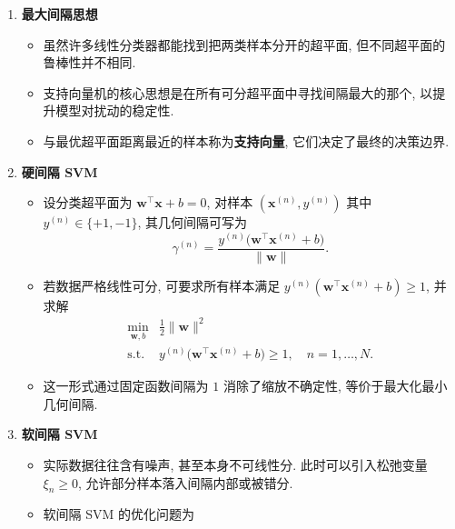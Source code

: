 \documentclass{../nndlcourse}
\begin{document}
\begin{enumerate}
    \item \textbf{最大间隔思想}
    \begin{itemize}
        \item 虽然许多线性分类器都能找到把两类样本分开的超平面, 但不同超平面的鲁棒性并不相同.
        \item 支持向量机的核心思想是在所有可分超平面中寻找间隔最大的那个, 以提升模型对扰动的稳定性.
        \item 与最优超平面距离最近的样本称为\textbf{支持向量}, 它们决定了最终的决策边界.
    \end{itemize}
    \item \textbf{硬间隔 SVM}
    \begin{itemize}
        \item 设分类超平面为 $\boldsymbol{w}^\top \boldsymbol{x} + b = 0$, 对样本 $(\boldsymbol{x}^{(n)}, y^{(n)})$ 其中 $y^{(n)} \in \{+1, -1\}$, 其几何间隔可写为
        \begin{equation*}
            \gamma^{(n)} = \frac{y^{(n)}\bigl(\boldsymbol{w}^\top \boldsymbol{x}^{(n)} + b\bigr)}{\|\boldsymbol{w}\|}.
        \end{equation*}
        \item 若数据严格线性可分, 可要求所有样本满足 $y^{(n)}(\boldsymbol{w}^\top \boldsymbol{x}^{(n)} + b) \ge 1$, 并求解
        \begin{equation*}
            \begin{array}{cl}
                \min_{\boldsymbol{w}, b} & \frac{1}{2}\|\boldsymbol{w}\|^2 \\
                \text{s.t.} & y^{(n)}\bigl(\boldsymbol{w}^\top \boldsymbol{x}^{(n)} + b\bigr) \ge 1, \quad n = 1, \dots, N.
            \end{array}
        \end{equation*}
        \item 这一形式通过固定函数间隔为 $1$ 消除了缩放不确定性, 等价于最大化最小几何间隔.
    \end{itemize}
    \item \textbf{软间隔 SVM}
    \begin{itemize}
        \item 实际数据往往含有噪声, 甚至本身不可线性分. 此时可以引入松弛变量 $\xi_n \ge 0$, 允许部分样本落入间隔内部或被错分.
        \item 软间隔 SVM 的优化问题为
        \begin{equation*}
            \begin{array}{ll}

\end{array}
\end{equation*}
\end{itemize}
\end{enumerate}
\end{document}
